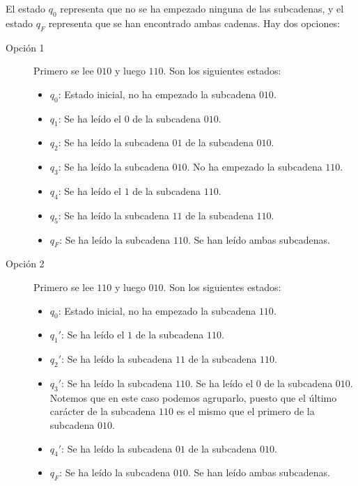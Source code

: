 \begin{ejercicio}
\begin{enumerate}
        El estado $q_0$ representa que no se ha empezado ninguna de las subcadenas, y el estado $q_F$ representa que se han encontrado ambas cadenas.
        Hay dos opciones:
        \begin{description}
            \item[Opción 1] Primero se lee $010$ y luego $110$. Son los siguientes estados:
            \begin{itemize}
                \item $q_0$: Estado inicial, no ha empezado la subcadena $010$.
                \item $q_1$: Se ha leído el $0$ de la subcadena $010$.
                \item $q_2$: Se ha leído la subcadena $01$ de la subcadena $010$.
                \item $q_3$: Se ha leído la subcadena $010$. No ha empezado la subcadena $110$.
                \item $q_4$: Se ha leído el $1$ de la subcadena $110$.
                \item $q_5$: Se ha leído la subcadena $11$ de la subcadena $110$.
                \item $q_F$: Se ha leído la subcadena $110$. Se han leído ambas subcadenas.
            \end{itemize}

            \item[Opción 2] Primero se lee $110$ y luego $010$. Son los siguientes estados:
            \begin{itemize}
                \item $q_0$: Estado inicial, no ha empezado la subcadena $110$.
                \item $q_1'$: Se ha leído el $1$ de la subcadena $110$.
                \item $q_2'$: Se ha leído la subcadena $11$ de la subcadena $110$.
                \item $q_3'$: Se ha leído la subcadena $110$. Se ha leído el $0$ de la subcadena $010$. Notemos que en este caso podemos agruparlo, puesto que el último carácter de la subcadena $110$ es el mismo que el primero de la subcadena $010$.
                \item $q_4'$: Se ha leído la subcadena $01$ de la subcadena $010$.
                \item $q_F$: Se ha leído la subcadena $010$. Se han leído ambas subcadenas.
            \end{itemize}
        \end{description}


\end{enumerate}
\end{ejercicio}
